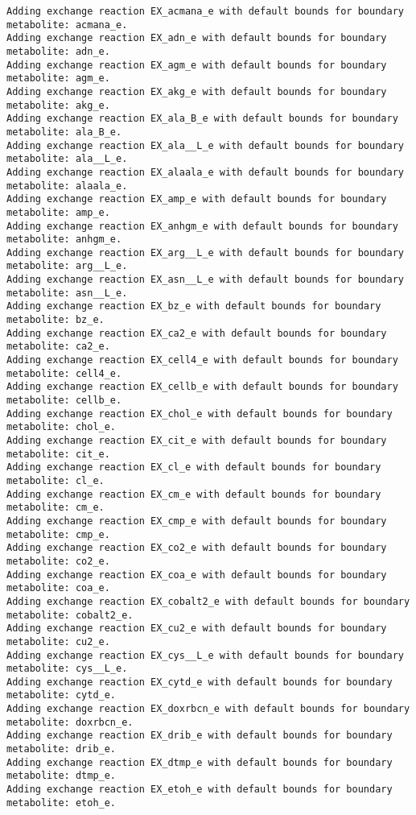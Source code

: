 \documentclass[
  letterpaper,
  DIV=11,
  numbers=noendperiod]{scrartcl}
\begin{document}
\begin{verbatim}
Adding exchange reaction EX_acmana_e with default bounds for boundary metabolite: acmana_e.
Adding exchange reaction EX_adn_e with default bounds for boundary metabolite: adn_e.
Adding exchange reaction EX_agm_e with default bounds for boundary metabolite: agm_e.
Adding exchange reaction EX_akg_e with default bounds for boundary metabolite: akg_e.
Adding exchange reaction EX_ala_B_e with default bounds for boundary metabolite: ala_B_e.
Adding exchange reaction EX_ala__L_e with default bounds for boundary metabolite: ala__L_e.
Adding exchange reaction EX_alaala_e with default bounds for boundary metabolite: alaala_e.
Adding exchange reaction EX_amp_e with default bounds for boundary metabolite: amp_e.
Adding exchange reaction EX_anhgm_e with default bounds for boundary metabolite: anhgm_e.
Adding exchange reaction EX_arg__L_e with default bounds for boundary metabolite: arg__L_e.
Adding exchange reaction EX_asn__L_e with default bounds for boundary metabolite: asn__L_e.
Adding exchange reaction EX_bz_e with default bounds for boundary metabolite: bz_e.
Adding exchange reaction EX_ca2_e with default bounds for boundary metabolite: ca2_e.
Adding exchange reaction EX_cell4_e with default bounds for boundary metabolite: cell4_e.
Adding exchange reaction EX_cellb_e with default bounds for boundary metabolite: cellb_e.
Adding exchange reaction EX_chol_e with default bounds for boundary metabolite: chol_e.
Adding exchange reaction EX_cit_e with default bounds for boundary metabolite: cit_e.
Adding exchange reaction EX_cl_e with default bounds for boundary metabolite: cl_e.
Adding exchange reaction EX_cm_e with default bounds for boundary metabolite: cm_e.
Adding exchange reaction EX_cmp_e with default bounds for boundary metabolite: cmp_e.
Adding exchange reaction EX_co2_e with default bounds for boundary metabolite: co2_e.
Adding exchange reaction EX_coa_e with default bounds for boundary metabolite: coa_e.
Adding exchange reaction EX_cobalt2_e with default bounds for boundary metabolite: cobalt2_e.
Adding exchange reaction EX_cu2_e with default bounds for boundary metabolite: cu2_e.
Adding exchange reaction EX_cys__L_e with default bounds for boundary metabolite: cys__L_e.
Adding exchange reaction EX_cytd_e with default bounds for boundary metabolite: cytd_e.
Adding exchange reaction EX_doxrbcn_e with default bounds for boundary metabolite: doxrbcn_e.
Adding exchange reaction EX_drib_e with default bounds for boundary metabolite: drib_e.
Adding exchange reaction EX_dtmp_e with default bounds for boundary metabolite: dtmp_e.
Adding exchange reaction EX_etoh_e with default bounds for boundary metabolite: etoh_e.

\end{verbatim}
\end{document}
